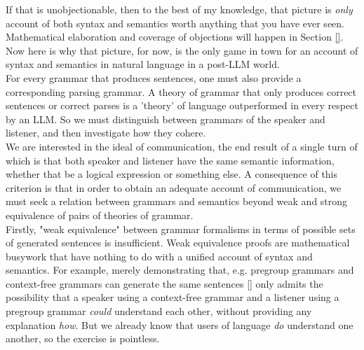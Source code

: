 \begin{fullwidth}
If that is unobjectionable, then to the best of my knowledge, that picture is \emph{only} account of both syntax and semantics worth anything that you have ever seen. Mathematical elaboration and coverage of objections will happen in Section \ref{}. Now here is why that picture, for now, is the only game in town for an account of syntax and semantics in natural language in a post-LLM world.\\

 For every grammar that produces sentences, one must also provide a corresponding parsing grammar. A theory of grammar that only produces correct sentences or correct parses is a 'theory' of language outperformed in every respect by an LLM. So we must distinguish between grammars of the speaker and listener, and then investigate how they cohere.\\

 We are interested in the ideal of communication, the end result of a single turn of which is that both speaker and listener have the same semantic information, whether that be a logical expression or something else. A consequence of this criterion is that in order to obtain an adequate account of communication, we must seek a relation between grammars and semantics beyond weak and strong equivalence of pairs of theories of grammar.\\

Firstly, "weak equivalence" between grammar formalisms in terms of possible sets of generated sentences is insufficient. Weak equivalence proofs are mathematical busywork that have nothing to do with a unified account of syntax and semantics. For example, merely demonstrating that, e.g. pregroup grammars and context-free grammars can generate the same sentences [] only admits the possibility that a speaker using a context-free grammar and a listener using a pregroup grammar \emph{could} understand each other, without providing any explanation \emph{how}. But we already know that users of language \emph{do} understand one another, so the exercise is pointless.\\


\end{fullwidth}
